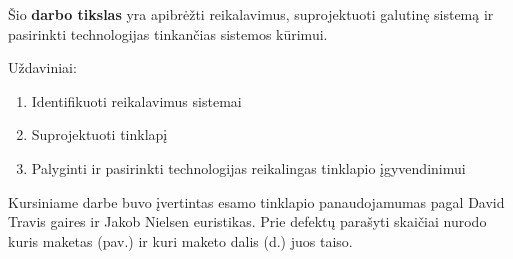 \documentclass{VUMIFPSkursinis}
\begin{document}
Šio \textbf{darbo tikslas} yra apibrėžti reikalavimus, suprojektuoti galutinę sistemą ir pasirinkti technologijas tinkančias sistemos kūrimui. 

Uždaviniai:
\begin{enumerate}
	\item Identifikuoti reikalavimus sistemai
	\item Suprojektuoti tinklapį
	\item Palyginti ir pasirinkti technologijas reikalingas tinklapio įgyvendinimui
\end{enumerate}

Kursiniame darbe buvo įvertintas esamo tinklapio panaudojamumas pagal David Travis gaires ir Jakob Nielsen euristikas\cite{Kursinis}. Prie defektų parašyti skaičiai nurodo kuris maketas (pav.) ir kuri maketo dalis (d.) juos taiso.
\end{document}
